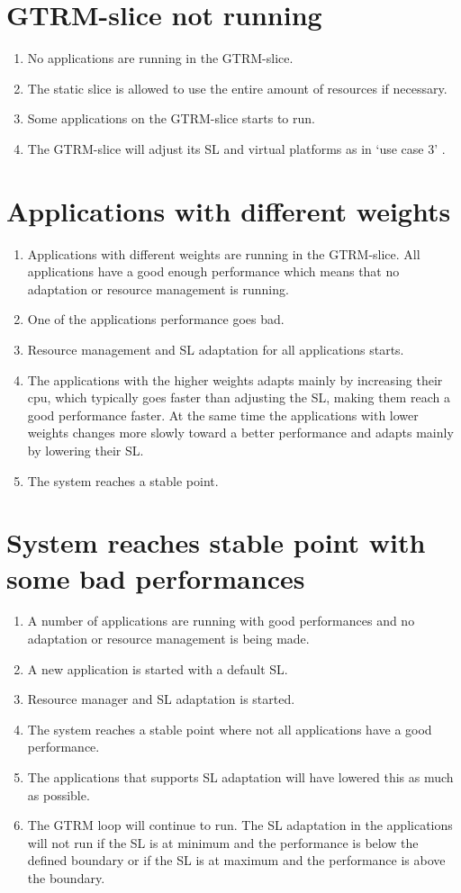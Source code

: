 \documentclass[nobiblatex]{LTHthesis}
\begin{document}
\section{GTRM-slice not running}
\begin{enumerate}
\item No applications are running in the GTRM-slice.
\item The static slice is allowed to use the entire amount of resources if necessary.
\item Some applications on the GTRM-slice starts to run.
\item The GTRM-slice will adjust its SL and virtual platforms as in ‘use case 3’ .
\end{enumerate}

\section{Applications with different weights}
\begin{enumerate}
\item Applications with different weights are running in the GTRM-slice. All applications have a good enough performance which means that no adaptation or resource management is running. 
\item One of the applications performance goes bad.
\item Resource management and SL adaptation for all applications starts.
\item The applications with the higher weights adapts mainly by increasing their cpu, which typically goes faster than adjusting the SL, making them reach a good performance faster. At the same time the applications with lower weights changes more slowly toward a better performance and adapts mainly by lowering their SL.
\item The system reaches a stable point.
\end{enumerate}

\section{System reaches stable point with some bad performances}
\begin{enumerate}
\item A number of applications are running with good performances and no adaptation or resource management is being made.
\item A new application is started with a default SL.
\item Resource manager and SL adaptation is started.
\item The system reaches a stable point where not all applications have a good performance. 
\item The applications that supports SL adaptation will have lowered this as much as possible.
\item The GTRM loop will continue to run. The SL adaptation in the applications will not run if the SL is at minimum and the performance is below the defined boundary or if the SL is at maximum and the performance is above the boundary.
\end{enumerate}
\end{document}

